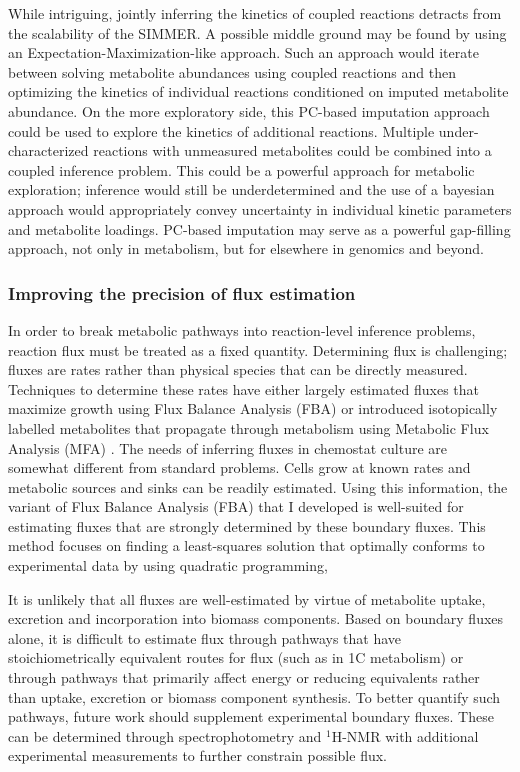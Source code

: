 While intriguing, jointly inferring the kinetics of coupled reactions detracts from the scalability of the SIMMER. A possible middle ground may be found by using an Expectation-Maximization-like approach. Such an approach would iterate between solving metabolite abundances using coupled reactions and then optimizing the kinetics of individual reactions conditioned on imputed metabolite abundance. On the more exploratory side, this PC-based imputation approach could be used to explore the kinetics of additional reactions. Multiple under-characterized reactions with unmeasured metabolites could be combined into a coupled inference problem. This could be a powerful approach for metabolic exploration; inference would still be underdetermined and the use of a bayesian approach would appropriately convey uncertainty in individual kinetic parameters and metabolite loadings. PC-based imputation may serve as a powerful gap-filling approach, not only in metabolism, but for elsewhere in genomics and beyond.

\subsubsection{Improving the precision of flux estimation}

In order to break metabolic pathways into reaction-level inference problems, reaction flux must be treated as a fixed quantity. Determining flux is challenging; fluxes are rates rather than physical species that can be directly measured. Techniques to determine these rates have either largely estimated fluxes that maximize growth using Flux Balance Analysis (FBA) \cite{Orth:2010hb} or introduced isotopically labelled metabolites that propagate through metabolism using Metabolic Flux Analysis (MFA) \cite{Zamboni:2009bp}. The needs of inferring fluxes in chemostat culture are somewhat different from standard problems. Cells grow at known rates and metabolic sources and sinks can be readily estimated. Using this information, the variant of Flux Balance Analysis (FBA) that I developed is well-suited for estimating fluxes that are strongly determined by these boundary fluxes. This method focuses on finding a least-squares solution that optimally conforms to experimental data by using quadratic programming, 

It is unlikely that all fluxes are well-estimated by virtue of metabolite uptake, excretion and incorporation into biomass components. Based on boundary fluxes alone, it is difficult to estimate flux through pathways that have stoichiometrically equivalent routes for flux (such as in 1C metabolism) or through pathways that primarily affect energy or reducing equivalents rather than uptake, excretion or biomass component synthesis. To better quantify such pathways, future work should supplement experimental boundary fluxes. These can be determined through spectrophotometry and $^{1}$H-NMR with additional experimental measurements to further constrain possible flux.

